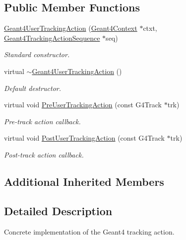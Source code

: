 \subsection*{Public Member Functions}
\begin{DoxyCompactItemize}
\item 
\hyperlink{class_d_d4hep_1_1_simulation_1_1_geant4_user_tracking_action_acee865c27f15ffd9f2d4c386f9ab7e8e}{Geant4\+User\+Tracking\+Action} (\hyperlink{class_d_d4hep_1_1_simulation_1_1_geant4_context}{Geant4\+Context} $\ast$ctxt, \hyperlink{class_d_d4hep_1_1_simulation_1_1_geant4_tracking_action_sequence}{Geant4\+Tracking\+Action\+Sequence} $\ast$seq)
\begin{DoxyCompactList}\small\item\em Standard constructor. \end{DoxyCompactList}\item 
virtual \hyperlink{class_d_d4hep_1_1_simulation_1_1_geant4_user_tracking_action_a2c2e499d1ac638f2519fa8f6f221bdc0}{$\sim$\+Geant4\+User\+Tracking\+Action} ()
\begin{DoxyCompactList}\small\item\em Default destructor. \end{DoxyCompactList}\item 
virtual void \hyperlink{class_d_d4hep_1_1_simulation_1_1_geant4_user_tracking_action_a3c44bbbed885071eb14c08274e1b32a2}{Pre\+User\+Tracking\+Action} (const G4\+Track $\ast$trk)
\begin{DoxyCompactList}\small\item\em Pre-\/track action callback. \end{DoxyCompactList}\item 
virtual void \hyperlink{class_d_d4hep_1_1_simulation_1_1_geant4_user_tracking_action_ab5aeccf26ec4213e75bbdf6927bc7ee6}{Post\+User\+Tracking\+Action} (const G4\+Track $\ast$trk)
\begin{DoxyCompactList}\small\item\em Post-\/track action callback. \end{DoxyCompactList}\end{DoxyCompactItemize}
\subsection*{Additional Inherited Members}


\subsection{Detailed Description}
Concrete implementation of the Geant4 tracking action. 

